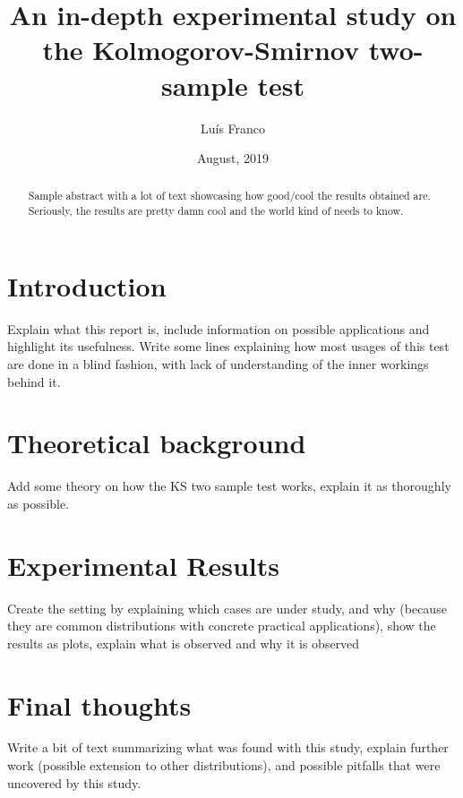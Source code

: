 \documentclass{article}
\title{An in-depth experimental study on the Kolmogorov-Smirnov two-sample test}
\date{August, 2019}
\author{Luís Franco}
\begin{document}
	\maketitle

	\begin{abstract}

		Sample abstract with a lot of text showcasing how good/cool the results obtained are. Seriously, the results are pretty damn cool and the world kind of needs to know.

	\end{abstract}

	\begin{multicols}{2}

	\section{Introduction}
	Explain what this report is, include information on possible applications and highlight its usefulness. Write some lines explaining how most usages of this test are done in a blind fashion, with lack of understanding of the inner workings behind it.

	\section{Theoretical background}
	Add some theory on how the KS two sample test works, explain it as thoroughly as possible. 

	\section{Experimental Results}

	Create the setting by explaining which cases are under study, and why (because they are common distributions with concrete practical applications), show the results as plots, explain what is observed and why it is observed 

	\section{Final thoughts}
	
	Write a bit of text summarizing what was found with this study, explain further work (possible extension to other distributions), and possible pitfalls that were uncovered by this study.

	\end{multicols}
\end{document}
